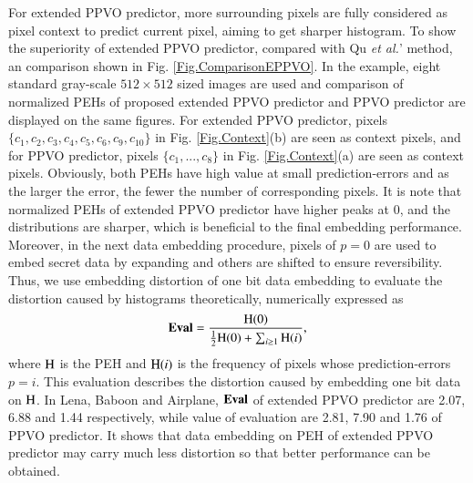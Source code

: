 \documentclass[review,3p,10pt,sort&compress]{elsarticle}
\begin{document}
For extended PPVO predictor, more surrounding pixels are fully considered as pixel context to predict current pixel, aiming to get sharper histogram. To show the superiority of extended PPVO predictor, compared with Qu \emph{et al.}' method, an comparison shown in Fig. \ref{Fig.ComparisonEPPVO}. In the example, eight standard gray-scale $512 \times 512$ sized images  are used and comparison of normalized PEHs of proposed extended PPVO predictor and PPVO predictor are displayed on the same figures.
For extended PPVO predictor, pixels $\{c_{1}, c_{2}, c_{3}, c_{4}, c_{5}, c_{6}, c_{9}, c_{10}\}$ in Fig. \ref{Fig.Context}(b) are seen as context pixels, and for PPVO predictor, pixels $\{c_{1}, ..., c_{8}\}$ in Fig. \ref{Fig.Context}(a) are seen as context pixels.
Obviously, both PEHs have high value at small prediction-errors and as the larger the error, the fewer the number of corresponding pixels. It is note that normalized PEHs of extended PPVO predictor have higher peaks at $0$, and the distributions are sharper, which is beneficial to the final embedding performance. Moreover, in the next data embedding procedure, pixels of $p = 0$ are used to embed secret data by expanding and others are shifted to ensure reversibility. Thus, we use embedding distortion of one bit data embedding to evaluate the distortion caused by histograms theoretically, numerically expressed as
\begin{equation*}\label{eq:EvaluateHistogram}
{\rm \mathbf{Eval}} = \frac{{\rm H}(0)}{\frac{1}{2}{\rm H}(0)+ \sum_{i \geq 1}{\rm H}(i)},
\end{equation*}
where ${\rm H}$ is the PEH and ${\rm H}(i)$ is the frequency of pixels whose prediction-errors $p = i$. This evaluation describes the distortion caused by embedding one bit data on ${\rm H}$. In Lena, Baboon and Airplane, ${\rm \mathbf{Eval}}$ of extended PPVO predictor are 2.07, 6.88 and 1.44 respectively, while value of evaluation are 2.81, 7.90 and 1.76 of PPVO predictor. It shows that data embedding on PEH of extended PPVO predictor may carry much less distortion so that better performance can be obtained.
\end{document}
